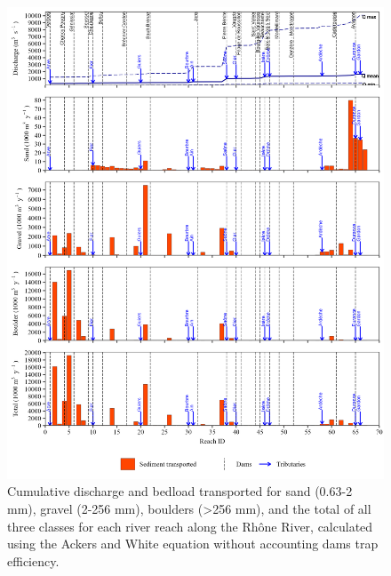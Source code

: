 \documentclass[
]{book}
\begin{document}
\begin{figure}
\includegraphics[width=26.24in]{img/res_cascade/res_E2_eA&W/plots_transp-silt/transp_res_sum_hy_E2_eA&W} \caption{Cumulative discharge and bedload transported for sand (0.63-2 mm), gravel (2-256 mm), boulders (>256 mm), and the total of all three classes for each river reach along the Rhône River, calculated using the Ackers and White equation without accounting dams trap efficiency.}\label{fig:TrE2eA}
\end{figure}
\end{document}
